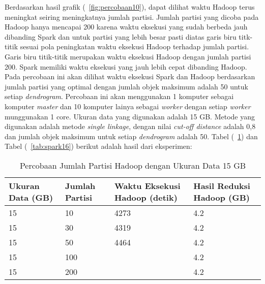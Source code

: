 Berdasarkan hasil grafik (~\ref{fig:percobaan10}), dapat dilihat waktu Hadoop terus meningkat seiring meningkatnya jumlah partisi. Jumlah partisi yang dicoba pada Hadoop hanya mencapai 200 karena waktu eksekusi yang sudah berbeda jauh dibanding Spark dan untuk partisi yang lebih besar pasti diatas garis biru titk-titik sesuai pola peningkatan waktu eksekusi Hadoop terhadap jumlah partisi. Garis biru titik-titik merupakan waktu eksekusi Hadoop dengan jumlah partisi 200. Spark memiliki waktu eksekusi yang jauh lebih cepat dibanding Hadoop.\\





Pada percobaan ini akan dilihat waktu eksekusi Spark dan Hadoop berdasarkan jumlah partisi yang optimal dengan jumlah objek maksimum adalah 50 untuk setiap \textit{dendrogram}. Percobaan ini akan menggunakan 1 komputer sebagai komputer \textit{master} dan 10 komputer lainya sebagai \textit{worker} dengan setiap \textit{worker} munggunakan 1 core. Ukuran data yang digunakan adalah 15 GB. Metode yang digunakan adalah metode \textit{single linkage}, dengan nilai \textit{cut-off distance} adalah 0,8 dan jumlah objek maksimum untuk setiap \textit{dendrogram} adalah 50. Tabel (~\ref{tab:spark15}) dan Tabel (~\ref{tab:spark16}) berikut adalah hasil dari eksperimen:





\begin{table}[H] 
	\centering 
	\caption{Percobaan Jumlah Partisi Hadoop dengan Ukuran Data 15 GB}
	\label{tab:spark15}
	\begin{tabular}{|p{3cm}|p{3cm}|p{4cm}|p{4cm}|}
\hline
Ukuran Data (GB) & Jumlah Partisi &  Waktu Eksekusi Hadoop (detik) & Hasil Reduksi Hadoop (GB)\\
\hline
15 & 10 & 4273  & 4.2  \\
\hline
15 & 30 & 4319  & 4.2  \\
\hline
15 & 50 & 4464  & 4.2  \\
\hline
15 & 100 &   & 4.2  \\
\hline
15 & 200 &   & 4.2  \\
\hline


\hline

	\end{tabular} 
\end{table}




